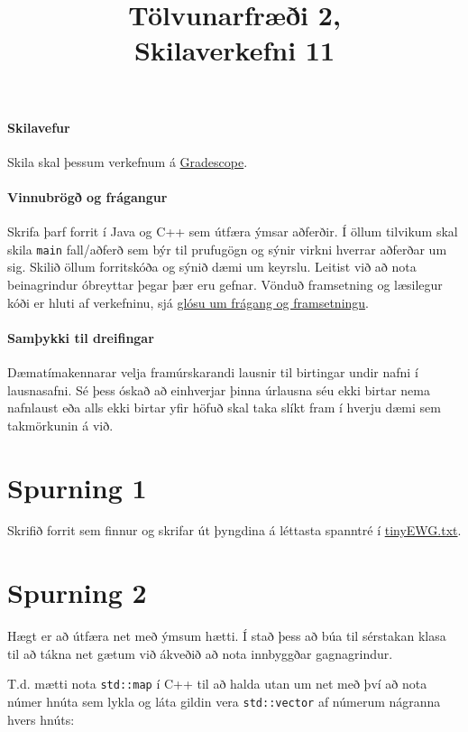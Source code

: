 \documentclass{article}
\title{Tölvunarfræði 2, \semester \\ Skilaverkefni 11}
\author{}
\begin{document}
\maketitle
{}

\paragraph{Skilavefur} Skila skal þessum verkefnum á \href{https://gradescope.com/courses/5640}{Gradescope}.

\paragraph{Vinnubrögð og frágangur} Skrifa þarf forrit í Java og C++ sem útfæra ýmsar aðferðir. Í öllum tilvikum skal skila \texttt{main} fall/aðferð sem býr til prufugögn og sýnir virkni hverrar aðferðar um sig. Skilið öllum forritskóða og sýnið dæmi um keyrslu. Leitist við að nota beinagrindur óbreyttar þegar þær eru gefnar. Vönduð framsetning og læsilegur kóði er hluti af verkefninu, sjá \href{https://piazza.com/class/ixkicfen49l111?cid=52}{glósu um frágang og framsetningu}.

\paragraph{Samþykki til dreifingar} Dæmatímakennarar velja framúrskarandi lausnir til birtingar undir nafni í lausnasafni. Sé þess óskað að einhverjar þinna úrlausna séu ekki birtar nema nafnlaust eða alls ekki birtar yfir höfuð skal taka slíkt fram í hverju dæmi sem takmörkunin á við.

\section{Spurning 1}
Skrifið forrit sem finnur og skrifar út þyngdina á léttasta spanntré í \href{https://github.com/Ernir/kennsluefni/tree/master/T2/Code/w11/tinyEWG.txt}{tinyEWG.txt}.

\section{Spurning 2}
Hægt er að útfæra net með ýmsum hætti. Í stað þess að búa til sérstakan klasa til að tákna net gætum við ákveðið að nota innbyggðar gagnagrindur.

T.d. mætti nota \texttt{std::map} í C++ til að halda utan um net með því að nota númer hnúta sem lykla og láta gildin vera \texttt{std::vector} af númerum nágranna hvers hnúts:
\end{document}
